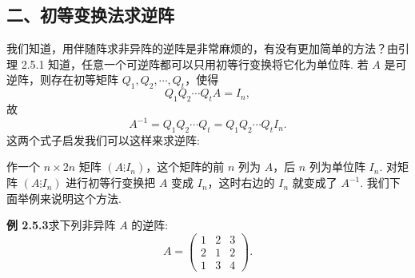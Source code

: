 \documentclass[UTF8,12pt,a4paper,fontset=fandol]{ctexart}
\begin{document}
\subsection*{二、初等变换法求逆阵}

我们知道，用伴随阵求非异阵的逆阵是非常麻烦的，有没有更加简单的方法？由引理 2.5.1 知道，任意一个可逆阵都可以只用初等行变换将它化为单位阵. 若 $A$ 是可逆阵，则存在初等矩阵 $Q_1,Q_2,\cdots,Q_t$，使得
\[
Q_1Q_2\cdots Q_tA=I_n,
\]
故
\[
A^{-1}=Q_1Q_2\cdots Q_t=Q_1Q_2\cdots Q_tI_n.
\]
这两个式子启发我们可以这样来求逆阵:

作一个 $n\times 2n$ 矩阵 $(A\vdots I_n)$，这个矩阵的前 $n$ 列为 $A$，后 $n$ 列为单位阵 $I_n$. 对矩阵 $(A\vdots I_n)$ 进行初等行变换把 $A$ 变成 $I_n$，这时右边的 $I_n$ 就变成了 $A^{-1}$. 我们下面举例来说明这个方法.

\noindent\textbf{例 2.5.3}\quad 求下列非异阵 $A$ 的逆阵:
\[
A=\left(\begin{array}{ccc}
1 & 2 & 3\\
2 & 1 & 2\\
1 & 3 & 4
\end{array}\right).
\]
\end{document}
